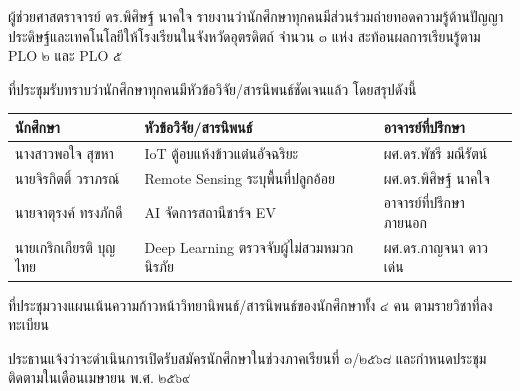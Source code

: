 \documentclass{meetingminutes}
\begin{document}
ผู้ช่วยศาสตราจารย์ ดร.พิศิษฐ์ นาคใจ รายงานว่านักศึกษาทุกคนมีส่วนร่วมถ่ายทอดความรู้ด้านปัญญาประดิษฐ์และเทคโนโลยีให้โรงเรียนในจังหวัดอุตรดิตถ์ จำนวน ๓ แห่ง สะท้อนผลการเรียนรู้ตาม PLO ๒ และ PLO ๕



ที่ประชุมรับทราบว่านักศึกษาทุกคนมีหัวข้อวิจัย/สารนิพนธ์ชัดเจนแล้ว โดยสรุปดังนี้

\begin{longtable}{|p{3.2cm}|p{5.5cm}|p{4.8cm}|}
  \hline
  \textbf{นักศึกษา} & \textbf{หัวข้อวิจัย/สารนิพนธ์} & \textbf{อาจารย์ที่ปรึกษา} \\
  \hline
  นางสาวพอใจ สุขหา & IoT ตู้อบแห้งข้าวแต๋นอัจฉริยะ & ผศ.ดร.พัชรี มณีรัตน์ \\
  \hline
  นายจิรกิตติ์ วราภรณ์ & Remote Sensing ระบุพื้นที่ปลูกอ้อย & ผศ.ดร.พิศิษฐ์ นาคใจ \\
  \hline
  นายจาตุรงค์ ทรงภักดี & AI จัดการสถานีชาร์จ EV & อาจารย์ที่ปรึกษาภายนอก \\
  \hline
  นายเกริกเกียรติ บุญไทย & Deep Learning ตรวจจับผู้ไม่สวมหมวกนิรภัย & ผศ.ดร.กาญจนา ดาวเด่น \\
  \hline
\end{longtable}




ที่ประชุมวางแผนเน้นความก้าวหน้าวิทยานิพนธ์/สารนิพนธ์ของนักศึกษาทั้ง ๔ คน ตามรายวิชาที่ลงทะเบียน



ประธานแจ้งว่าจะดำเนินการเปิดรับสมัครนักศึกษาในช่วงภาคเรียนที่ ๓/๒๕๖๘ และกำหนดประชุมติดตามในเดือนเมษายน พ.ศ. ๒๕๖๙


\adjournmeeting

\begin{sigblock}
\end{sigblock}
\end{document}
